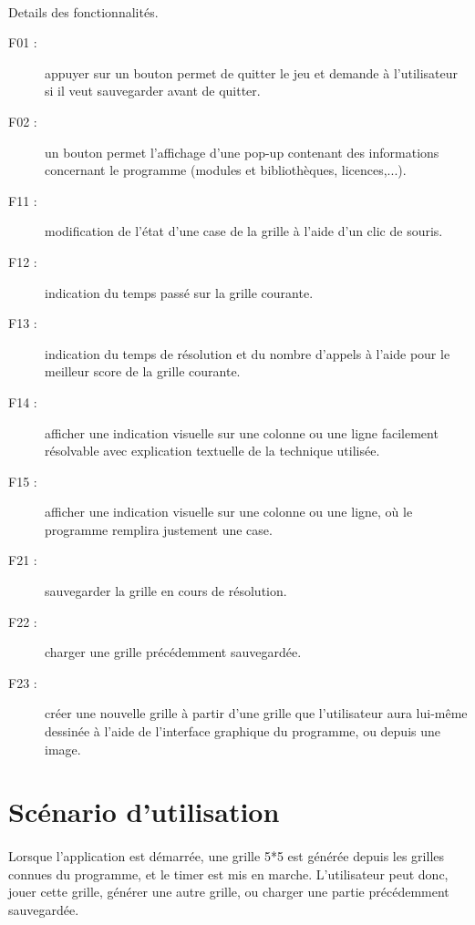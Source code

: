         \paragraph*{}
        Details des fonctionnalités.
        \begin{description}
                \item[F01 :] appuyer sur un bouton permet de quitter le jeu et demande à l'utilisateur si il veut sauvegarder avant de quitter.
                \item[F02 :] un bouton permet l'affichage d'une pop-up contenant des informations concernant le programme (modules et bibliothèques, licences,...).
                \item[F11 :] modification de l'état d'une case de la grille à l'aide d'un clic de souris.
                \item[F12 :] indication du temps passé sur la grille courante.
                \item[F13 :] indication du temps de résolution et du nombre d'appels à l'aide pour le meilleur score de la grille courante.
                \item[F14 :] afficher une indication visuelle sur une colonne ou une ligne facilement résolvable avec explication textuelle de la technique utilisée.
                \item[F15 :] afficher une indication visuelle sur une colonne ou une ligne, où le programme remplira justement une case.
                \item[F21 :] sauvegarder la grille en cours de résolution.
                \item[F22 :] charger une grille précédemment sauvegardée.
                \item[F23 :] créer une nouvelle grille  à partir d'une grille que l'utilisateur aura lui-même dessinée à l'aide  de l'interface graphique du programme, ou depuis une image.
        \end{description}


\section{Scénario d'utilisation}
        \paragraph*{}
        Lorsque l'application est démarrée, une grille 5*5 est générée depuis les grilles connues du programme, et le timer est mis en marche. L'utilisateur peut donc, jouer cette grille, générer une autre grille, ou charger une partie précédemment sauvegardée.
